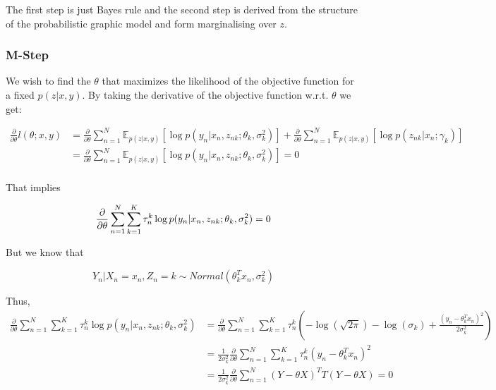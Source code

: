 \documentclass{article}
\begin{document}
\begin{enumerate}
The first step is just Bayes rule and the second step is derived from the structure of the probabilistic graphic model and form marginalising over $z$.

\subsubsection*{M-Step}
We wish to find the $\theta$ that maximizes the likelihood of the objective function for a fixed $p(z|x,y)$. By taking the derivative of the objective function w.r.t. $\theta$ we get:

\begin{equation*}
\begin{split}
\frac{\partial}{\partial \theta}l(\theta;x,y) &= \frac{\partial}{\partial \theta}\sum_{n=1}^N\mathbb{E}_{p(z|x,y)}\left[\log p(y_n|x_n,z_{nk};\theta_k,\sigma_k^2)\right] + \frac{\partial}{\partial \theta}\sum_{n=1}^N\mathbb{E}_{p(z|x,y)}\left[\log p(z_{nk}|x_n;\gamma_k)\right]\\
 &= \frac{\partial}{\partial \theta}\sum_{n=1}^N\mathbb{E}_{p(z|x,y)}\left[\log p(y_n|x_n,z_{nk};\theta_k,\sigma_k^2)\right] = 0\\
\end{split}
\end{equation*}

That implies 

\begin{equation*}
\frac{\partial}{\partial \theta}\sum_{n=1}^N\sum_{k=1}^K \tau_n^k\log p(y_n|x_n,z_{nk};\theta_k,\sigma_k^2) = 0\\
\end{equation*}

But we know that

\begin{equation*}
Y_n | X_n = x_n, Z_n = k \sim Normal(\theta_k^T x_n, \sigma_k^2)
\end{equation*}

Thus,
\begin{equation*}
\begin{split}
\frac{\partial}{\partial \theta}\sum_{n=1}^N\sum_{k=1}^K \tau_n^k\log p(y_n|x_n,z_{nk};\theta_k,\sigma_k^2) &= \frac{\partial}{\partial \theta}\sum_{n=1}^N\sum_{k=1}^K \tau_n^k \left( -\log(\sqrt{2\pi}) - \log(\sigma_k) + \frac{(y_n-\theta_k^Tx_n)^2}{2\sigma_k^2}  \right)\\
&= \frac{1}{2\sigma_k^2}\frac{\partial}{\partial \theta}\sum_{n=1}^N\sum_{k=1}^K \tau_n^k  (y_n-\theta_k^Tx_n)^2\\
&= \frac{1}{2\sigma_k^2}\frac{\partial}{\partial \theta}\sum_{n=1}^N  (Y-\theta X)^TT(Y-\theta X) = 0\\
\end{split}
\end{equation*}


\end{enumerate}
\end{document}
